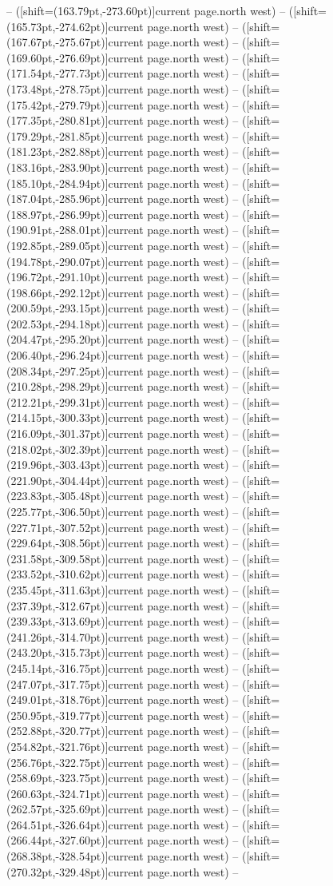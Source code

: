 \documentclass[11pt]{article}
\begin{document}
-- ([shift={(163.79pt,-273.60pt)}]current page.north west) -- ([shift={(165.73pt,-274.62pt)}]current page.north west) -- ([shift={(167.67pt,-275.67pt)}]current page.north west) -- ([shift={(169.60pt,-276.69pt)}]current page.north west) -- ([shift={(171.54pt,-277.73pt)}]current page.north west) -- ([shift={(173.48pt,-278.75pt)}]current page.north west) -- ([shift={(175.42pt,-279.79pt)}]current page.north west) -- ([shift={(177.35pt,-280.81pt)}]current page.north west) -- ([shift={(179.29pt,-281.85pt)}]current page.north west) -- ([shift={(181.23pt,-282.88pt)}]current page.north west) -- ([shift={(183.16pt,-283.90pt)}]current page.north west) -- ([shift={(185.10pt,-284.94pt)}]current page.north west) -- ([shift={(187.04pt,-285.96pt)}]current page.north west) -- ([shift={(188.97pt,-286.99pt)}]current page.north west) -- ([shift={(190.91pt,-288.01pt)}]current page.north west) -- ([shift={(192.85pt,-289.05pt)}]current page.north west) -- ([shift={(194.78pt,-290.07pt)}]current page.north west) -- ([shift={(196.72pt,-291.10pt)}]current page.north west) -- ([shift={(198.66pt,-292.12pt)}]current page.north west) -- ([shift={(200.59pt,-293.15pt)}]current page.north west) -- ([shift={(202.53pt,-294.18pt)}]current page.north west) -- ([shift={(204.47pt,-295.20pt)}]current page.north west) -- ([shift={(206.40pt,-296.24pt)}]current page.north west) -- ([shift={(208.34pt,-297.25pt)}]current page.north west) -- ([shift={(210.28pt,-298.29pt)}]current page.north west) -- ([shift={(212.21pt,-299.31pt)}]current page.north west) -- ([shift={(214.15pt,-300.33pt)}]current page.north west) -- ([shift={(216.09pt,-301.37pt)}]current page.north west) -- ([shift={(218.02pt,-302.39pt)}]current page.north west) -- ([shift={(219.96pt,-303.43pt)}]current page.north west) -- ([shift={(221.90pt,-304.44pt)}]current page.north west) -- ([shift={(223.83pt,-305.48pt)}]current page.north west) -- ([shift={(225.77pt,-306.50pt)}]current page.north west) -- ([shift={(227.71pt,-307.52pt)}]current page.north west) -- ([shift={(229.64pt,-308.56pt)}]current page.north west) -- ([shift={(231.58pt,-309.58pt)}]current page.north west) -- ([shift={(233.52pt,-310.62pt)}]current page.north west) -- ([shift={(235.45pt,-311.63pt)}]current page.north west) -- ([shift={(237.39pt,-312.67pt)}]current page.north west) -- ([shift={(239.33pt,-313.69pt)}]current page.north west) -- ([shift={(241.26pt,-314.70pt)}]current page.north west) -- ([shift={(243.20pt,-315.73pt)}]current page.north west) -- ([shift={(245.14pt,-316.75pt)}]current page.north west) -- ([shift={(247.07pt,-317.75pt)}]current page.north west) -- ([shift={(249.01pt,-318.76pt)}]current page.north west) -- ([shift={(250.95pt,-319.77pt)}]current page.north west) -- ([shift={(252.88pt,-320.77pt)}]current page.north west) -- ([shift={(254.82pt,-321.76pt)}]current page.north west) -- ([shift={(256.76pt,-322.75pt)}]current page.north west) -- ([shift={(258.69pt,-323.75pt)}]current page.north west) -- ([shift={(260.63pt,-324.71pt)}]current page.north west) -- ([shift={(262.57pt,-325.69pt)}]current page.north west) -- ([shift={(264.51pt,-326.64pt)}]current page.north west) -- ([shift={(266.44pt,-327.60pt)}]current page.north west) -- ([shift={(268.38pt,-328.54pt)}]current page.north west) -- ([shift={(270.32pt,-329.48pt)}]current page.north west) -- 
\end{document}
